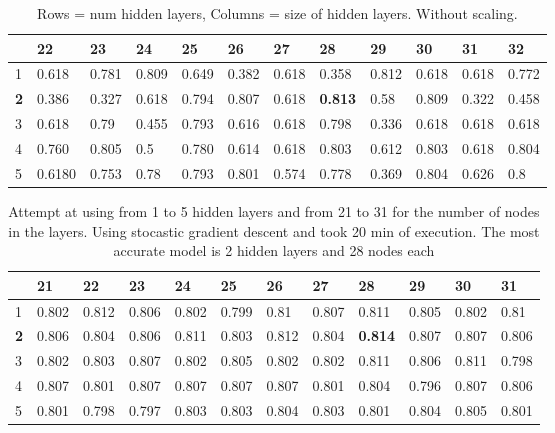 \documentclass{article}
\begin{document}
\begin{table}[]
\caption{Rows = num hidden layers, Columns = size of hidden layers. Without scaling.}
\centering
\label{tab:sklearn-NoScaling}
\begin{tabular}{|l|l|l|l|l|l|l|l|l|l|l|l|}
\hline
           & 22       & 23       & 24       & 25       & 26       & 27       & \textbf{28}       & 29       & 30       & 31       & 32       \\ \hline
1          & 0.618 & 0.781 & 0.809 & 0.649 & 0.382 & 0.618 & 0.358          & 0.812 & 0.618 & 0.618 & 0.772 \\ \hline
\textbf{2} & 0.386 & 0.327 & 0.618 & 0.794 & 0.807 & 0.618 & \textbf{0.813} & 0.58 & 0.809 & 0.322 & 0.458 \\ \hline
3          & 0.618 & 0.79 & 0.455 & 0.793 & 0.616 & 0.618 & 0.798          & 0.336 & 0.618 & 0.618 & 0.618 \\ \hline
4          & 0.760 & 0.805 & 0.5 & 0.780 & 0.614 & 0.618 & 0.803          & 0.612 & 0.803 & 0.618 & 0.804 \\ \hline
5          & 0.6180 & 0.753 & 0.78 & 0.793 & 0.801 & 0.574 & 0.778          & 0.369 & 0.804 & 0.626 & 0.8 \\ \hline
\end{tabular}

\end{table}


\begin{table}[]
\caption{Attempt at using from 1 to 5 hidden layers and from 21 to 31 for the number of nodes in the layers. Using stocastic gradient descent and took 20 min of execution.
The most  accurate model is 2 hidden layers and 28 nodes each}
\label{tab:Scaled_gradient}
\begin{tabular}{|l|l|l|l|l|l|l|l|l|l|l|l|}
\hline
           & 21    & 22    & 23    & 24    & 25    & 26    & 27    & \textbf{28}    & 29    & 30    & 31    \\ \hline
1          & 0.802 & 0.812 & 0.806 & 0.802 & 0.799 & 0.81  & 0.807 & 0.811          & 0.805 & 0.802 & 0.81  \\ \hline
\textbf{2} & 0.806 & 0.804 & 0.806 & 0.811 & 0.803 & 0.812 & 0.804 & \textbf{0.814} & 0.807 & 0.807 & 0.806 \\ \hline
3          & 0.802 & 0.803 & 0.807 & 0.802 & 0.805 & 0.802 & 0.802 & 0.811          & 0.806 & 0.811 & 0.798 \\ \hline
4          & 0.807 & 0.801 & 0.807 & 0.807 & 0.807 & 0.807 & 0.801 & 0.804          & 0.796 & 0.807 & 0.806 \\ \hline
5          & 0.801 & 0.798 & 0.797 & 0.803 & 0.803 & 0.804 & 0.803 & 0.801          & 0.804 & 0.805 & 0.801 \\ \hline
\end{tabular}
\end{table}
\end{document}
